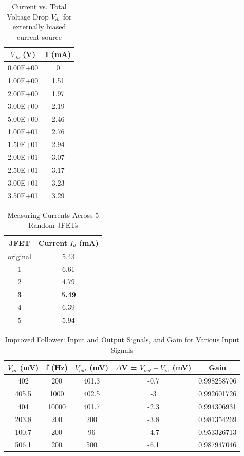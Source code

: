 \documentclass{article}
\begin{document}
    \begin{table}[H]
        \centering
        \caption{Current vs. Total Voltage Drop $V_{ds}$ for externally biased current source}
        \label{my-label}
        \begin{tabular}{cc}
        \textbf{$V_{ds}$ (V)} & \textbf{I (mA)} \\ \hline
        0.00E+00 & 0 \\
        1.00E+00 & 1.51 \\
        2.00E+00 & 1.97 \\
        3.00E+00 & 2.19 \\
        5.00E+00 & 2.46 \\
        1.00E+01 & 2.76 \\
        1.50E+01 & 2.94 \\
        2.00E+01 & 3.07 \\
        2.50E+01 & 3.17 \\
        3.00E+01 & 3.23 \\
        3.50E+01 & 3.29
        \end{tabular}
    \end{table}
    \begin{table}[H]
    \centering
    \caption{Measuring Currents Across 5 Random JFETs}
    \label{my-label}
    \begin{tabular}{cc}
    \textbf{JFET} & \textbf{Current $I_d$ (mA)} \\ \hline
    original & 5.43 \\
    1 & 6.61 \\
    2 & 4.79 \\
    {\color[HTML]{FE0000} \textbf{3}} & {\color[HTML]{FE0000} \textbf{5.49}} \\
    4 & 6.39  \\
    5 & 5.94
    \end{tabular}
    \end{table}
    \begin{table}[H]
        \centering
        \caption{Improved Follower: Input and Output Signals, and Gain for Various Input Signals}
        \label{my-label}
        \begin{tabular}{ccccc}
        \textbf{$V_{in}$ (mV)} & \textbf{f (Hz)} & \textbf{$V_{out}$ (mV)} & \textbf{$\Delta$V = $V_{out} - V_{in}$ (mV)} & \textbf{Gain} \\ \hline
        402 & 200 & 401.3 & -0.7 & 0.998258706 \\
        405.5 & 1000 & 402.5 & -3 & 0.992601726 \\
        404 & 10000 & 401.7 & -2.3 & 0.994306931 \\
        203.8 & 200 & 200 & -3.8 & 0.981354269 \\
        100.7 & 200 & 96 & -4.7 & 0.953326713 \\
        506.1 & 200 & 500 & -6.1 & 0.987947046
        \end{tabular}
    \end{table}
\end{document}
